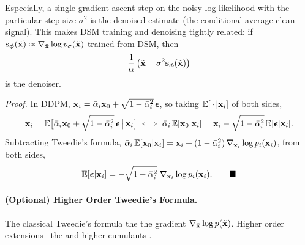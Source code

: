 Especially,  a single gradient-ascent step on the noisy log-likelihood with the particular step size $\sigma^2$
is the denoised estimate (the conditional average clean signal). This makes
DSM training and denoising tightly related: if ${\mathbf{s}}_{\bm{\phi}}(\tilde{{\mathbf{x}}})\approx
\nabla_{\tilde{{\mathbf{x}}}}\log p_\sigma(\tilde{{\mathbf{x}}})$ trained from DSM, then
\[
\frac{1}{\alpha}\left(\tilde{{\mathbf{x}}}+\sigma^2 {\mathbf{s}}_{\bm{\phi}}(\tilde{{\mathbf{x}}})\right)
\]
is the denoiser.
\begin{nknote}
\noindent\textit{Proof.} In DDPM, ${\mathbf{x}}_i = \bar{\alpha}_i{\mathbf{x}}_0 + \sqrt{1-\bar{\alpha}_i^2}\,{\bm{\epsilon}}$, so taking $\mathbb{E}[\,\cdot\,|{\mathbf{x}}_i]$ of both sides,
\[
{\mathbf{x}}_i = \mathbb{E}\big[\bar{\alpha}_i{\mathbf{x}}_0 + \sqrt{1-\bar{\alpha}_i^2}\,{\bm{\epsilon}} \,\big|\, {\mathbf{x}}_i\big]
\;\Longleftrightarrow\;
\bar{\alpha}_i\,\mathbb{E}[{\mathbf{x}}_0|{\mathbf{x}}_i] = {\mathbf{x}}_i - \sqrt{1-\bar{\alpha}_i^2}\,\mathbb{E}[{\bm{\epsilon}}|{\mathbf{x}}_i].
\]
Subtracting Tweedie's formula, $\bar{\alpha}_i\,\mathbb{E}[{\mathbf{x}}_0|{\mathbf{x}}_i] = {\mathbf{x}}_i + (1-\bar{\alpha}_i^2)\,\nabla_{{\mathbf{x}}_i}\log p_i({\mathbf{x}}_i)$, from both sides,
\[
\mathbb{E}[{\bm{\epsilon}}|{\mathbf{x}}_i] = -\sqrt{1-\bar{\alpha}_i^2}\;\nabla_{{\mathbf{x}}_i}\log p_i({\mathbf{x}}_i). \hspace{2em}\blacksquare
\]
\end{nknote}

\paragraph{(Optional) Higher Order Tweedie's Formula.} The classical Tweedie's formula  the   the gradient $\nabla_{\tilde{{\mathbf{x}}}}\log p(\tilde{{\mathbf{x}}})$.
Higher order extensions~\citep{meng2021estimating}  the  and higher cumulants .

